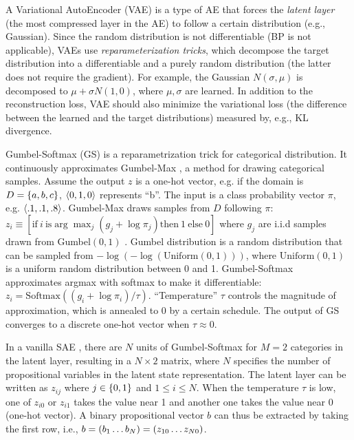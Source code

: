 A Variational AutoEncoder (VAE) \cite{kingma2013auto} is a type of AE that forces the \emph{latent layer} (the most compressed layer in the AE) to follow a certain distribution (e.g., Gaussian).
Since the random distribution is not differentiable (BP is not applicable), VAEs use \emph{reparameterization tricks}, which decompose the target distribution into a differentiable and a purely random distribution (the latter does not require the gradient).
For example, the Gaussian $N(\sigma,\mu)$ is decomposed to $\mu+\sigma N(1,0)$, where $\mu,\sigma$ are learned.
In addition to the reconstruction loss, VAE should also minimize the variational loss (the difference between the learned and the target distributions) measured by, e.g.,  KL divergence.

Gumbel-Softmax (GS) is a reparametrization trick \cite{jang2016categorical} for categorical distribution.
It continuously approximates Gumbel-Max \cite{maddison2014sampling}, a method for drawing categorical samples.
Assume the output $z$ is a one-hot vector, e.g. if the domain is $D={\left\{a,b,c\right\}}$, ${\left<0,1,0\right>}$ represents ``b''.
The input is a class probability vector $\pi$, e.g. ${\left<.1,.1,.8\right>}$.
Gumbel-Max draws samples from $D$ following $\pi$:
 $z_i \equiv [ \text{if}\ i\ \text{is} \arg \max_j (g_j+\log \pi_j) \text{then}\ 1\ \text{else}\ 0 ]$
where $g_j$ are i.i.d samples drawn from Gumbel$(0,1)$ \cite{gumbel1954statistical}.
Gumbel distribution is a random distribution that can be sampled from $-\log (-\log (\text{Uniform}(0,1)))$, where
$\text{Uniform}(0,1)$ is a uniform random distribution between 0 and 1.
Gumbel-Softmax approximates argmax with softmax to make it differentiable:
$z_i = \text{Softmax}((g_i+\log \pi_i)/\tau)$.
``Temperature'' $\tau$ controls the magnitude of approximation, which is annealed to 0 by a certain schedule.
The output of GS converges to a discrete one-hot vector when $\tau\approx 0$.

In a vanilla SAE \cite{Asai2018}, there are $N$ units of Gumbel-Softmax
for $M=2$ categories in the latent layer, resulting in a $N\times 2$ matrix,
where $N$ specifies the number of propositional variables in the latent
state representation. The latent layer can be written as
$z_{ij}$ where $j\in {\left\{0,1\right\}}$ and $1\leq i \leq N$.  When the
temperature $\tau$ is low, one of $z_{i0}$ or $z_{i1}$ takes the value
near 1 and another one takes the value near 0 (one-hot vector).  A binary
propositional vector $b$ can thus be extracted by taking the first row, i.e.,
$b={\left(b_1\ldots b_N\right)}={\left(z_{10}\ldots z_{N0}\right)}$.

